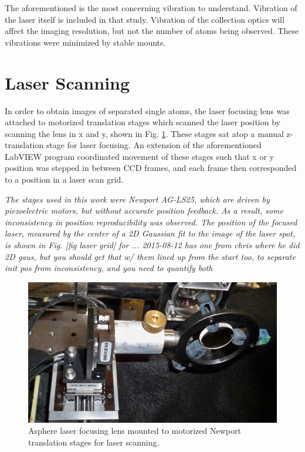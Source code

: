 

The aforementioned is the most concerning vibration to understand.  Vibration of the laser itself is included in that study.  Vibration of the collection optics will affect the imaging resolution, but not the number of atoms being observed.  These vibrations were minimized by stable mounts.

\section{Laser Scanning}
\label{sec:laserscanning}

In order to obtain images of separated single atoms, the laser focusing lens was attached to motorized translation stages which scanned the laser position by scanning the lens in x and y, shown in Fig. \ref{fig:laserStages}.  These stages sat atop a manual z-translation stage for laser focusing.  An extension of the aforementioned LabVIEW program coordinated movement of these stages such that x or y position was stepped in between CCD frames, and each frame then corresponded to a position in a laser scan grid.

\emph{\color{red}The stages used in this work were Newport AG-LS25, which are driven by piezoelectric motors, but without accurate position feedback.  As a result, some inconsistency in position reproducibility was observed.  The position of the focused laser, measured by the center of a 2D Gaussian fit to the image of the laser spot, is shown in Fig. [fig laser grid] for ... 2015-08-12 has one from chris where he did 2D gaus, but you should get that w/ them lined up from the start too, to separate init pos from inconsistency, and you need to quantify both}


\begin{figure} %
        \centering
                \includegraphics[width=.5\textwidth]{figures/stages_2.JPG}
                \caption{Asphere laser focusing lens mounted to motorized Newport translation stages for laser scanning.}
\label{fig:laserStages}
\end{figure}
